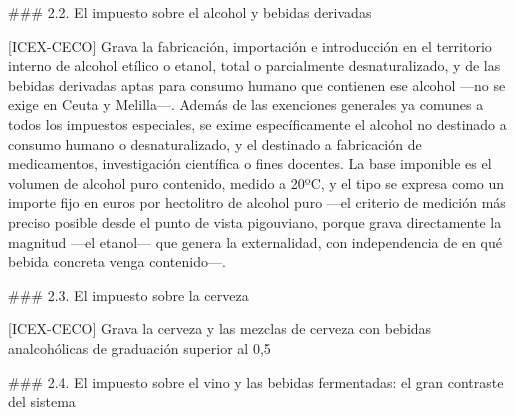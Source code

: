 \documentclass[10pt,a4paper]{article}
\begin{document}
### 2.2. El impuesto sobre el alcohol y bebidas derivadas

[ICEX-CECO] Grava la fabricación, importación e introducción en el territorio interno de alcohol etílico o etanol, total o parcialmente desnaturalizado, y de las bebidas derivadas aptas para consumo humano que contienen ese alcohol —no se exige en Ceuta y Melilla—. Además de las exenciones generales ya comunes a todos los impuestos especiales, se exime específicamente el alcohol no destinado a consumo humano o desnaturalizado, y el destinado a fabricación de medicamentos, investigación científica o fines docentes. La base imponible es el volumen de alcohol puro contenido, medido a 20ºC, y el tipo se expresa como un importe fijo en euros por hectolitro de alcohol puro —el criterio de medición más preciso posible desde el punto de vista pigouviano, porque grava directamente la magnitud —el etanol— que genera la externalidad, con independencia de en qué bebida concreta venga contenido—.

### 2.3. El impuesto sobre la cerveza

[ICEX-CECO] Grava la cerveza y las mezclas de cerveza con bebidas analcohólicas de graduación superior al 0,5%

### 2.4. El impuesto sobre el vino y las bebidas fermentadas: el gran contraste del sistema
\end{document}
